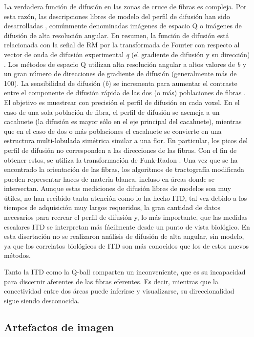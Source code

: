 \documentclass[12pt,a5,twoside]{book}
\begin{document}
La verdadera función de difusión en las zonas de cruce de fibras es compleja. Por esta razón, las descripciones libres de modelo del perfil de difusión han sido desarrolladas \citep{Alexander_2002,Tuch_2004}, comúnmente denominadas imágenes de espacio Q o imágenes de difusión de alta resolución angular. En resumen, la función de difusión está relacionada con la señal de RM por la transformada de Fourier con respecto al vector de onda de difusión experimental {\it q} (el gradiente de difusión y su dirección) \citep{Stejskal_1965, Tuch_2004}. Los métodos de espacio Q utilizan alta resolución angular a altos valores de {\it b} y un gran número de direcciones de gradiente de difusión (generalmente más de 100). La sensibilidad de difusión ({\it b}) se incrementa para aumentar el contraste entre el componente de difusión rápida de las dos (o más) poblaciones de fibras \citep{Tuch_2003}. El objetivo es muestrear con precisión el perfil de difusión en cada voxel. En el caso de una sola población de fibra, el perfil de difusión se asemeja a un cacahuete (la difusión es mayor sólo en el eje principal del cacahuete), mientras que en el caso de dos o más poblaciones el cacahuete se convierte en una estructura multi-lobulada simétrica similar a una flor. En particular, los picos del perfil de difusión no corresponden a las direcciones de las fibras. Con el fin de obtener estos, se utiliza  la transformación de Funk-Radon \citep{Tuch_2004}. Una vez que se ha encontrado la orientación de las fibras, los algoritmos de tractografía modificada pueden representar haces de materia blanca, incluso en áreas donde se intersectan. Aunque estas mediciones de difusión libres de modelos son muy útiles, no han recibido tanta atención como lo ha hecho ITD, tal vez debido a los tiempos de adquisición muy largos requeridos, la gran cantidad de datos necesarios para recrear el perfil de difusión y, lo más importante, que las medidas escalares ITD se interpretan más fácilmente desde un punto de vista biológico. En esta disertación no se realizaron análisis de difusión de alta angular, sin modelo, ya que los correlatos biológicos de ITD son más conocidos que los de estos nuevos métodos.

Tanto la ITD como la Q-ball comparten un inconveniente, que es su incapacidad para discernir aferentes de las fibras eferentes. Es decir, mientras que la conectividad entre dos áreas puede inferirse y visualizarse, su direccionalidad sigue siendo desconocida.

\subsection{Artefactos de imagen}
\end{document}
